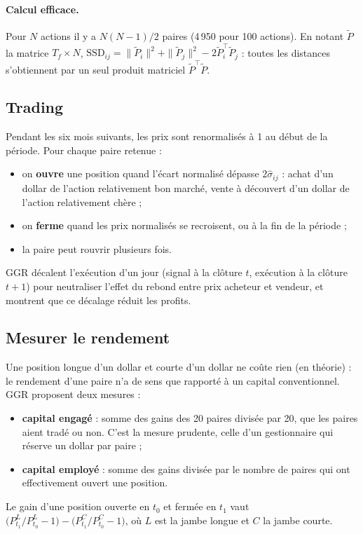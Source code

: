 \paragraph{Calcul efficace.} Pour $N$ actions il y a $N(N-1)/2$ paires (4\,950 pour 100 actions). En notant $\tilde P$ la matrice $T_f\times N$, $\mathrm{SSD}_{ij} = \|\tilde P_i\|^2 + \|\tilde P_j\|^2 - 2\tilde P_i^\top\tilde P_j$ : toutes les distances s'obtiennent par un seul produit matriciel $\tilde P^\top\tilde P$.

\subsection{Trading}

Pendant les six mois suivants, les prix sont renormalisés à 1 au début de la période. Pour chaque paire retenue :
\begin{itemize}
\item on \textbf{ouvre} une position quand l'écart normalisé dépasse $2\hat\sigma_{ij}$ : achat d'un dollar de l'action relativement bon marché, vente à découvert d'un dollar de l'action relativement chère ;
\item on \textbf{ferme} quand les prix normalisés se recroisent, ou à la fin de la période ;
\item la paire peut rouvrir plusieurs fois.
\end{itemize}
GGR décalent l'exécution d'un jour (signal à la clôture $t$, exécution à la clôture $t+1$) pour neutraliser l'effet du rebond entre prix acheteur et vendeur, et montrent que ce décalage réduit les profits.

\subsection{Mesurer le rendement}

Une position longue d'un dollar et courte d'un dollar ne coûte rien (en théorie) : le \og rendement\fg{} d'une paire n'a de sens que rapporté à un capital conventionnel. GGR proposent deux mesures :
\begin{itemize}
\item \textbf{capital engagé} : somme des gains des 20 paires divisée par 20, que les paires aient tradé ou non. C'est la mesure prudente, celle d'un gestionnaire qui réserve un dollar par paire ;
\item \textbf{capital employé} : somme des gains divisée par le nombre de paires qui ont effectivement ouvert une position.
\end{itemize}
Le gain d'une position ouverte en $t_0$ et fermée en $t_1$ vaut $\big(P^L_{t_1}/P^L_{t_0} - 1\big) - \big(P^C_{t_1}/P^C_{t_0} - 1\big)$, où $L$ est la jambe longue et $C$ la jambe courte.

